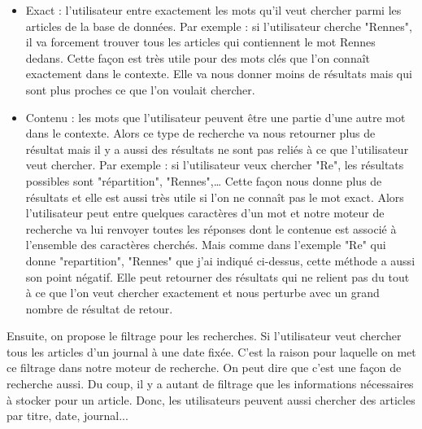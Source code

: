 \begin{itemize}
\item Exact : l'utilisateur entre exactement les mots qu'il veut chercher parmi les articles de la base de données. Par exemple : si l'utilisateur cherche "Rennes", il va forcement trouver tous les articles qui contiennent le mot Rennes dedans. Cette façon est très utile pour des mots clés que l’on connaît exactement dans le contexte. Elle va nous donner moins de résultats mais qui sont plus proches ce que l’on voulait chercher.
\item Contenu : les mots que l'utilisateur peuvent être une partie d'une autre mot dans le contexte. Alors ce type de recherche va nous retourner plus de résultat mais il y a aussi des résultats ne sont pas reliés à ce que l'utilisateur veut chercher. Par exemple : si l'utilisateur veux chercher "Re", les résultats possibles sont "répartition", "Rennes",… Cette façon nous donne plus de résultats et elle est aussi très utile si l’on ne connaît pas le mot exact. Alors l’utilisateur peut entre quelques caractères d’un mot et notre moteur de recherche va lui renvoyer toutes les réponses dont le contenue est associé à l’ensemble des caractères cherchés. Mais comme dans l’exemple "Re" qui donne "repartition", "Rennes" que j’ai indiqué ci-dessus, cette méthode a aussi son point négatif. Elle peut retourner des résultats qui ne relient pas du tout à ce que l’on veut chercher exactement et nous perturbe avec un grand nombre de résultat de retour.
\end{itemize}

	Ensuite, on propose le filtrage pour les recherches. Si l'utilisateur veut chercher tous les articles d’un journal à une date fixée. C’est la raison pour laquelle on met ce filtrage dans notre moteur de recherche. On peut dire que c’est une façon de recherche aussi. Du coup, il y a autant de filtrage que les informations nécessaires à stocker pour un article. Donc, les utilisateurs peuvent aussi chercher des articles par titre, date, journal... %
 
